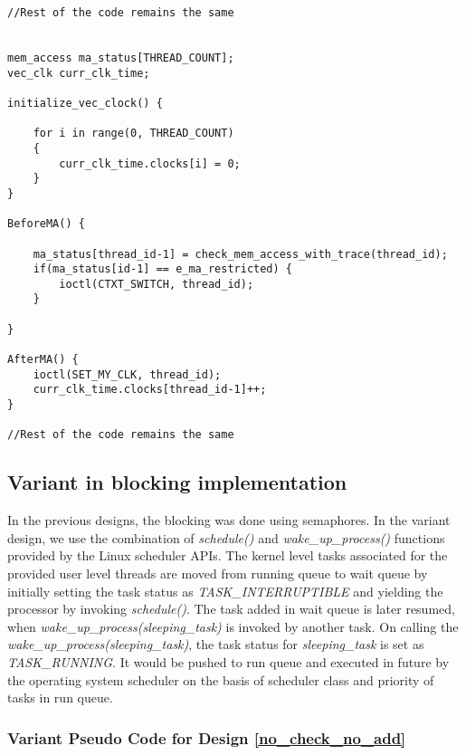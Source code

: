 \begin{lstlisting}[title=User Space Implementation, style=customc]
//Rest of the code remains the same


mem_access ma_status[THREAD_COUNT];
vec_clk curr_clk_time;

initialize_vec_clock() {

    for i in range(0, THREAD_COUNT)
    {
        curr_clk_time.clocks[i] = 0;
    }
}

BeforeMA() {

	ma_status[thread_id-1] = check_mem_access_with_trace(thread_id);
	if(ma_status[id-1] == e_ma_restricted) {
		ioctl(CTXT_SWITCH, thread_id);	
	}
	  
}

AfterMA() {	
	ioctl(SET_MY_CLK, thread_id);
	curr_clk_time.clocks[thread_id-1]++;
}

//Rest of the code remains the same

\end{lstlisting}

\subsection{Variant in blocking implementation}

In the previous designs, the blocking was done using semaphores. 
In the variant design, we use the combination of \emph{schedule()} and \emph{wake\_up\_process()} functions provided by the Linux scheduler APIs. 
The kernel level tasks associated for the provided user level threads are moved from running queue to wait queue by initially setting the task status as \emph{TASK\_INTERRUPTIBLE} and yielding the processor by invoking \emph{schedule()}. 
The task added in wait queue is later resumed, when \emph{wake\_up\_process(sleeping\_task)} is invoked by another task. 
On calling the \emph{wake\_up\_process(sleeping\_task)}, the task status for \emph{sleeping\_task} is set as \emph{TASK\_RUNNING}. 
It would be pushed to run queue and executed in future by the operating system scheduler on the basis of scheduler class and priority of tasks in run queue. 
 
 
\subsubsection*{Variant Pseudo Code for Design \ref{no_check_no_add}}



